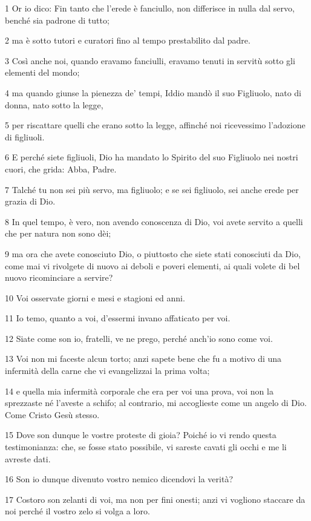 \par 1 Or io dico: Fin tanto che l'erede è fanciullo, non differisce in nulla dal servo, benché sia padrone di tutto;
\par 2 ma è sotto tutori e curatori fino al tempo prestabilito dal padre.
\par 3 Così anche noi, quando eravamo fanciulli, eravamo tenuti in servitù sotto gli elementi del mondo;
\par 4 ma quando giunse la pienezza de' tempi, Iddio mandò il suo Figliuolo, nato di donna, nato sotto la legge,
\par 5 per riscattare quelli che erano sotto la legge, affinché noi ricevessimo l'adozione di figliuoli.
\par 6 E perché siete figliuoli, Dio ha mandato lo Spirito del suo Figliuolo nei nostri cuori, che grida: Abba, Padre.
\par 7 Talché tu non sei più servo, ma figliuolo; e se sei figliuolo, sei anche erede per grazia di Dio.
\par 8 In quel tempo, è vero, non avendo conoscenza di Dio, voi avete servito a quelli che per natura non sono dèi;
\par 9 ma ora che avete conosciuto Dio, o piuttosto che siete stati conosciuti da Dio, come mai vi rivolgete di nuovo ai deboli e poveri elementi, ai quali volete di bel nuovo ricominciare a servire?
\par 10 Voi osservate giorni e mesi e stagioni ed anni.
\par 11 Io temo, quanto a voi, d'essermi invano affaticato per voi.
\par 12 Siate come son io, fratelli, ve ne prego, perché anch'io sono come voi.
\par 13 Voi non mi faceste alcun torto; anzi sapete bene che fu a motivo di una infermità della carne che vi evangelizzai la prima volta;
\par 14 e quella mia infermità corporale che era per voi una prova, voi non la sprezzaste né l'aveste a schifo; al contrario, mi accoglieste come un angelo di Dio. Come Cristo Gesù stesso.
\par 15 Dove son dunque le vostre proteste di gioia? Poiché io vi rendo questa testimonianza: che, se fosse stato possibile, vi sareste cavati gli occhi e me li avreste dati.
\par 16 Son io dunque divenuto vostro nemico dicendovi la verità?
\par 17 Costoro son zelanti di voi, ma non per fini onesti; anzi vi vogliono staccare da noi perché il vostro zelo si volga a loro.
